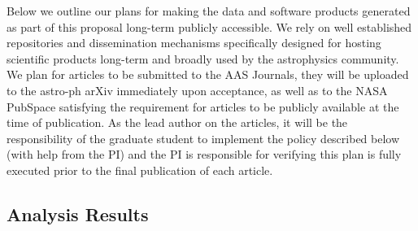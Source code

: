 %
\label{sec:dmp}


Below we outline our plans for making the data and software products generated
as part of this proposal long-term publicly accessible. We rely on well
established repositories and dissemination mechanisms specifically designed for
hosting scientific products long-term and broadly used by the astrophysics
community. We plan for articles to be submitted to the AAS Journals, they will
be uploaded to the astro-ph arXiv immediately upon acceptance, as well as to the
NASA PubSpace satisfying the requirement for articles to be publicly available
at the time of publication. As the lead author on the articles, it will be the
responsibility of the graduate student to implement the policy described below
(with help from the PI) and the PI is responsible for verifying this plan is
fully executed prior to the final publication of each article.

\subsection{Analysis Results}
%
\label{sec:dmp_results}


